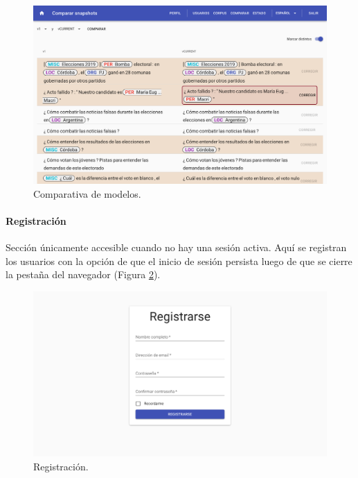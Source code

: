 \documentclass[12pt,a4paper,]{scrartcl}
\let\oldparagraph\paragraph
\renewcommand{\paragraph}[1]{\oldparagraph{#1}\mbox{}}
\begin{document}
\begin{figure}[H]

{\centering \includegraphics{assets/logic/compare.pdf} 

}

\caption{Comparativa de modelos.}\label{fig:logic-compare}
\end{figure}

\hypertarget{registraciuxf3n}{%
\paragraph{Registración}\label{registraciuxf3n}}

Sección únicamente accesible cuando no hay una sesión activa. Aquí se registran los usuarios con la opción de que el inicio de sesión persista luego de que se cierre la pestaña del navegador (Figura \ref{fig:logic-registration}).

\begin{figure}[H]

{\centering \includegraphics{assets/logic/register.pdf} 

}

\caption{Registración.}\label{fig:logic-registration}
\end{figure}
\end{document}
